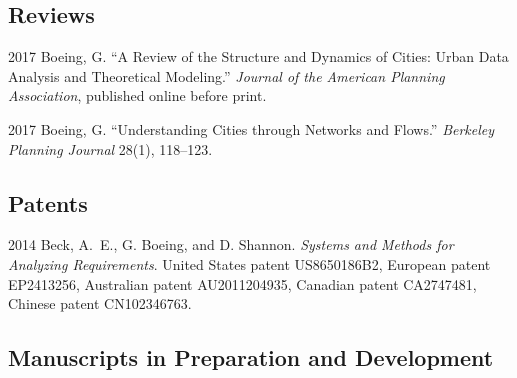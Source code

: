 \documentclass{academiccv}
\begin{document}
\subsection*{Reviews}

\begin{tablist}
	
\item[2017] \tab Boeing, G. \enquote{A Review of the Structure and Dynamics of Cities: Urban Data Analysis and Theoretical Modeling.} \emph{Journal of the American Planning Association}, published online before print.
	
\item[2017] \tab Boeing, G. \enquote{Understanding Cities through Networks and Flows.} \emph{Berkeley Planning Journal} 28(1), 118--123.
	
\end{tablist}



\subsection*{Patents}

\begin{tablist}

\item[2014] \tab Beck, A.~E., G. Boeing, and D. Shannon. \emph{Systems and Methods for Analyzing Requirements}. United States patent US8650186B2, European patent EP2413256, Australian patent AU2011204935, Canadian patent CA2747481, Chinese patent CN102346763.

\end{tablist}



\subsection*{Manuscripts in Preparation and Development}
\end{document}

